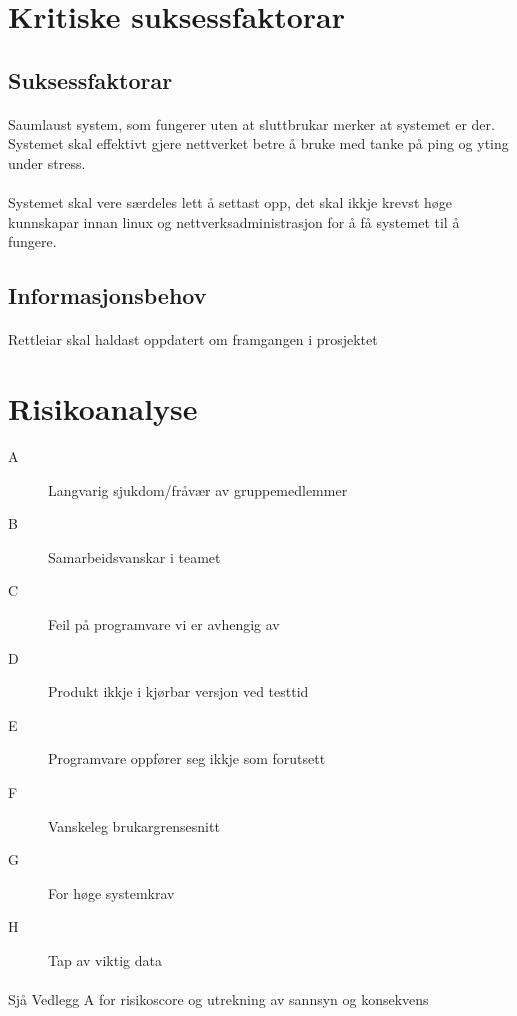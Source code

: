 \documentclass[nynorsk,12pt,a4paper]{article}
\begin{document}
\newpage
\section{Kritiske suksessfaktorar}
\subsection{Suksessfaktorar}
\paragraph{}
Saumlaust system, som fungerer uten at sluttbrukar merker at systemet er der. Systemet skal effektivt gjere nettverket betre å bruke med tanke på ping og yting under stress. 
\paragraph{}
Systemet skal vere særdeles lett å settast opp, det skal ikkje krevst høge kunnskapar innan linux og nettverksadministrasjon for å få systemet til å fungere.

\subsection{Informasjonsbehov}
\paragraph{}
Rettleiar skal haldast oppdatert om framgangen i prosjektet

\newpage
\section{Risikoanalyse}
\begin{description}
	\item[A] Langvarig sjukdom/fråvær av gruppemedlemmer
	\item[B] Samarbeidsvanskar i teamet
	\item[C] Feil på programvare vi er avhengig av
	\item[D] Produkt ikkje i kjørbar versjon ved testtid
	\item[E] Programvare oppfører seg ikkje som forutsett
	\item[F] Vanskeleg brukargrensesnitt
	\item[G] For høge systemkrav
	\item[H] Tap av viktig data
\end{description}
\paragraph{}
Sjå Vedlegg A for risikoscore og utrekning av sannsyn og konsekvens
\end{document}
